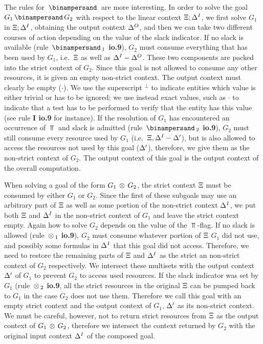 The rules for $\With$ are more interesting. In order to solve the goal $G_1
\With G_2$ with respect to the linear context $\Xi;\Delta^I$, we first solve $G_1$
in $\Xi;\Delta^I$, obtaining the output context $\Delta^O$, and then we can take two
different courses of action depending on the value of the slack indicator. If
no slack is available (rule {\bf $\With_1$ io.9}), $G_2$ must consume
everything that has been used by $G_1$, i.e.\ $\Xi$ as well as $\Delta^I - \Delta^O$.
These two components are packed into the strict context of $G_2$.  Since this
goal is not allowed to consume any other resources, it is given an empty
non-strict context. The output context must clearly be empty ($\cdot$).  We
use the superscript $^\bot$ to indicate entities which value is either
trivial or has to be ignored; we use instead exact values, such as $\cdot$ to
indicate that a test has to be performed to verify that the entity has this
value (see rule {\bf I io.9} for instance). If the resolution of $G_1$ has
encountered an occurrence of $\Top$ and slack is admitted (rule {\bf
  $\With_2$ io.9}), $G_2$ must still consume every resource used by $G_1$
(i.e.\ $\Xi,\Delta^I - \Delta'$), but is also allowed to access the resources not used
by this goal ($\Delta'$), therefore, we give them as the non-strict context of
$G_2$. The output context of this goal is the output context of the overall
computation.

When solving a goal of the form $G_1 \, \otimes \, G_2$, the strict context $\Xi$
must be consumed by either $G_1$ or $G_2$. Since the first of these subgoals
may use an arbitrary part of $\Xi$ as well as some portion of the non-strict
context $\Delta^I$, we put both $\Xi$ and $\Delta^I$ in the non-strict context of
$G_1$ and leave the strict context empty. Again how to solve $G_2$ depends on
the value of the $\Top$-flag. If no slack is allowed (rule {\bf $\, \otimes \,_1$
  io.9}), $G_2$ must consume whatever portion of $\Xi$ $G_1$ did not use, and
possibly some formulas in $\Delta^I$ that this goal did not access. Therefore, we
need to restore the remaining parts of $\Xi$ and $\Delta^I$ as the strict an
non-strict context of $G_2$ respectively. We intersect these multisets with
the output context $\Delta'$ of $G_1$ to prevent $G_2$ to access used resources.
If the slack indicator was set by $G_1$ (rule {\bf $\, \otimes \,_2$ io.9}, all the
strict resources in the original $\Xi$ can be pumped back to $G_1$ in the case
$G_2$ does not use them. Therefore we call this goal with an empty strict
context and the output context of $G_1$, $\Delta'$ as its non-strict context. We
must be careful, however, not to return strict resources from $\Xi$ as the
output context of $G_1 \, \otimes \, G_2$, therefore we intersect the context
returned by $G_2$ with the original input context $\Delta^I$ of the composed
goal.

